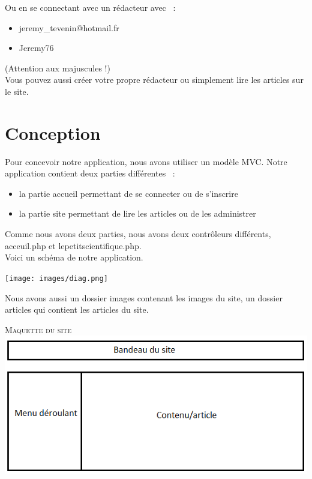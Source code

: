 \documentclass[hidelinks, 12pt,a4paper]{article}
\begin{document}
Ou en se connectant avec un rédacteur avec ~:
\begin{itemize}
\item jeremy\_tevenin@hotmail.fr
\item Jeremy76\\
\end{itemize}

(Attention aux majuscules !)\\

Vous pouvez aussi créer votre propre rédacteur ou simplement lire les articles sur le site.

\newpage
\section{Conception}
Pour concevoir notre application, nous avons utiliser un modèle MVC. Notre application contient deux parties différentes ~:\\
\begin{itemize}
\item la partie accueil permettant de se connecter ou de s'inscrire
\item la partie site permettant de lire les articles ou de les administrer
\end{itemize}

Comme nous avons deux parties, nous avons deux contrôleurs différents, acceuil.php et lepetitscientifique.php.\\

Voici un schéma de notre application.\\

\begin{center}
\texttt{[image: images/diag.png]}\\
\end{center}

Nous avons aussi un dossier images contenant les images du site, un dossier articles qui contient les articles du site.\\

\newpage
\begin{center}
\textsc{Maquette du site}\\
\includegraphics[width=16cm]{images/maquette.png}\\
\end{center}
 
\end{document}
